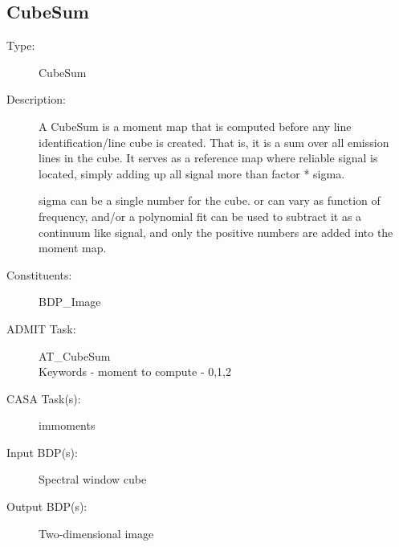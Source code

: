 \subsection{CubeSum}
\begin{description}
\item[Type:] CubeSum

\item[Description:]

A CubeSum is a moment map that is computed before any line
identification/line cube is created.  That is, it is a sum over all
emission lines in the cube.  It serves as a reference map where reliable
signal is located, simply adding up all signal more than factor * sigma.

sigma can be a single number for the cube.  or can vary as function of
frequency, and/or a polynomial fit can be used to subtract it as a continuum
like signal, and only the positive numbers are added into the moment map.

\item[Constituents:]  BDP\_Image

\item[ADMIT Task:] AT\_CubeSum \\
   Keywords - moment to compute - 0,1,2

\item[CASA Task(s):] immoments

\item[Input BDP(s):] Spectral window cube

\item[Output BDP(s):] Two-dimensional image
\end{description}

